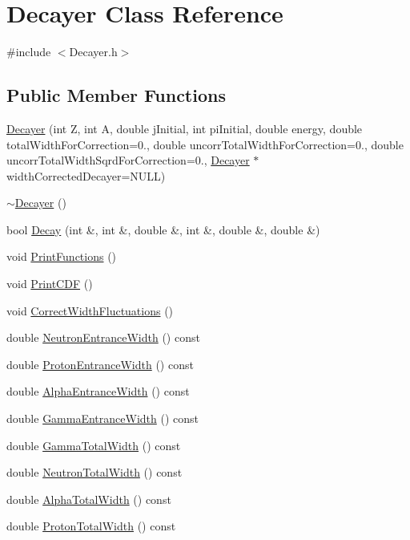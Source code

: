 \hypertarget{classDecayer}{\section{Decayer Class Reference}
\label{classDecayer}
}


{\ttfamily \#include $<$Decayer.\-h$>$}

\subsection*{Public Member Functions}
\begin{DoxyCompactItemize}
\item 
\hyperlink{classDecayer_ad4e6aceb46b118259dda6ebdf5bcffac}{Decayer} (int Z, int A, double j\-Initial, int pi\-Initial, double energy, double total\-Width\-For\-Correction=0., double uncorr\-Total\-Width\-For\-Correction=0., double uncorr\-Total\-Width\-Sqrd\-For\-Correction=0., \hyperlink{classDecayer}{Decayer} $\ast$width\-Corrected\-Decayer=N\-U\-L\-L)
\item 
\hyperlink{classDecayer_a83cc67333df8ddc762972d28320131cc}{$\sim$\-Decayer} ()
\item 
bool \hyperlink{classDecayer_ab465d6cd75519adf0a1f6ce6b4c67dad}{Decay} (int \&, int \&, double \&, int \&, double \&, double \&)
\item 
void \hyperlink{classDecayer_a668eb3fc4c9aaea313b3889147ad259a}{Print\-Functions} ()
\item 
void \hyperlink{classDecayer_ae55bb7d24d76fcaa8c7953679e623cd7}{Print\-C\-D\-F} ()
\item 
void \hyperlink{classDecayer_a1065c3b437c4c7f659a89ab80faaf4ab}{Correct\-Width\-Fluctuations} ()
\item 
double \hyperlink{classDecayer_a2bcb307cb6ba5ddf72bfb89bbcfc8741}{Neutron\-Entrance\-Width} () const 
\item 
double \hyperlink{classDecayer_a327a52a4b2a2220bff60e1e68a464c4a}{Proton\-Entrance\-Width} () const 
\item 
double \hyperlink{classDecayer_a3c8e9b6efc257af91fb0048e9f656fc8}{Alpha\-Entrance\-Width} () const 
\item 
double \hyperlink{classDecayer_afd064e6f77a3eb11c55fb3af2845c002}{Gamma\-Entrance\-Width} () const 
\item 
double \hyperlink{classDecayer_a6452d36b9d38cc668bfa18f8a57d8c91}{Gamma\-Total\-Width} () const 
\item 
double \hyperlink{classDecayer_a7d54c1018c08eaa1bc60e10155b77de3}{Neutron\-Total\-Width} () const 
\item 
double \hyperlink{classDecayer_a9b80ff34073127ae7c3f13949d858219}{Alpha\-Total\-Width} () const 
\item 
double \hyperlink{classDecayer_a1d46f4f7244f45670c3d18eb29882e0c}{Proton\-Total\-Width} () const 
\end{DoxyCompactItemize}
